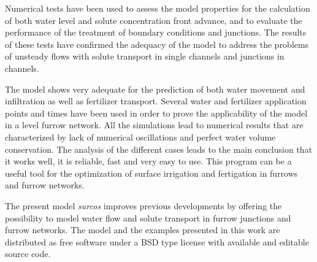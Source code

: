 \documentclass[review,authoryear]{elsarticle}
\begin{document}
Numerical tests have been used to assess the model properties for the
calculation of both water level and solute concentration front advance, and to
evaluate the performance of the treatment of boundary conditions and junctions.
The results of these tests have confirmed the adequacy of the model to address
the problems of unsteady flows with solute transport in single channels and
junctions in channels. 

The model shows very adequate for the prediction of both water movement and
infiltration as well as fertilizer transport. Several water and fertilizer
application points and times have been used in order to prove the applicability
of the model in a level furrow network. All the simulations lead to numerical
results that are characterized by lack of numerical oscillations and perfect
water volume conservation. The analysis of the different cases leads to the main
conclusion that it works well, it is reliable, fast and very easy to use. This
program can be a useful tool for the optimization of surface irrigation and
fertigation in furrows and furrow networks.

The present model \emph{surcos} improves previous developments by offering the
possibility to model water flow and solute transport in furrow junctions and
furrow networks. The model and the examples presented in this work are
distributed \citep{Surcos,SurcosGit} as free software under a BSD type license
with available and editable source code.
\end{document}
